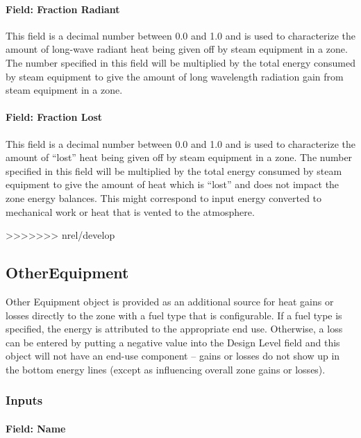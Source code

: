 \paragraph{Field: Fraction Radiant}\label{field-fraction-radiant-5-steam-definition}

This field is a decimal number between 0.0 and 1.0 and is used to characterize the amount of long-wave radiant heat being given off by steam equipment in a zone. The number specified in this field will be multiplied by the total energy consumed by steam equipment to give the amount of long wavelength radiation gain from steam equipment in a zone.

\paragraph{Field: Fraction Lost}\label{field-fraction-lost-3-steam-definition}

This field is a decimal number between 0.0 and 1.0 and is used to characterize the amount of ``lost'' heat being given off by steam equipment in a zone. The number specified in this field will be multiplied by the total energy consumed by steam equipment to give the amount of heat which is ``lost'' and does not impact the zone energy balances. This might correspond to input energy converted to mechanical work or heat that is vented to the atmosphere.

>>>>>>> nrel/develop
\subsection{OtherEquipment}\label{otherequipment}

Other Equipment object is provided as an additional source for heat gains or losses directly to the zone with a fuel type that is configurable. If a fuel type is specified, the energy is attributed to the appropriate end use. Otherwise, a loss can be entered by putting a negative value into the Design Level field and this object will not have an end-use component -- gains or losses do not show up in the bottom energy lines (except as influencing overall zone gains or losses).

\subsubsection{Inputs}\label{inputs-8-010}

\paragraph{Field: Name}\label{field-name-8-008}

